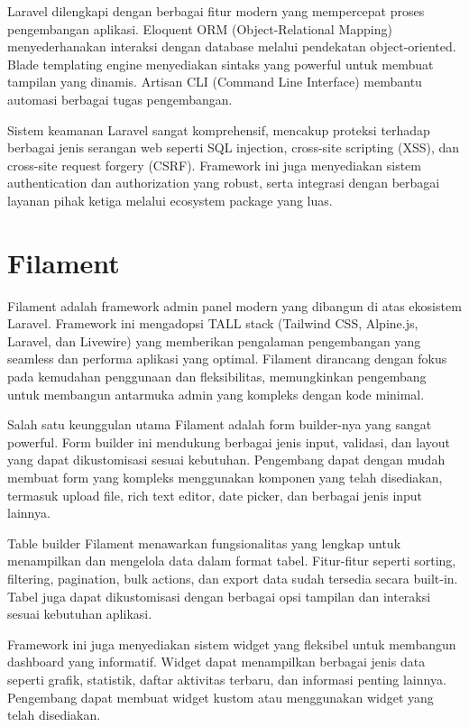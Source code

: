 \documentclass[a4paper,12pt]{report}
\begin{document}
Laravel dilengkapi dengan berbagai fitur modern yang mempercepat proses pengembangan aplikasi. Eloquent ORM (Object-Relational Mapping) menyederhanakan interaksi dengan database melalui pendekatan object-oriented. Blade templating engine menyediakan sintaks yang powerful untuk membuat tampilan yang dinamis. Artisan CLI (Command Line Interface) membantu automasi berbagai tugas pengembangan.

Sistem keamanan Laravel sangat komprehensif, mencakup proteksi terhadap berbagai jenis serangan web seperti SQL injection, cross-site scripting (XSS), dan cross-site request forgery (CSRF). Framework ini juga menyediakan sistem authentication dan authorization yang robust, serta integrasi dengan berbagai layanan pihak ketiga melalui ecosystem package yang luas.

\section{Filament}
Filament adalah framework admin panel modern yang dibangun di atas ekosistem Laravel. Framework ini mengadopsi TALL stack (Tailwind CSS, Alpine.js, Laravel, dan Livewire) yang memberikan pengalaman pengembangan yang seamless dan performa aplikasi yang optimal. Filament dirancang dengan fokus pada kemudahan penggunaan dan fleksibilitas, memungkinkan pengembang untuk membangun antarmuka admin yang kompleks dengan kode minimal.

Salah satu keunggulan utama Filament adalah form builder-nya yang sangat powerful. Form builder ini mendukung berbagai jenis input, validasi, dan layout yang dapat dikustomisasi sesuai kebutuhan. Pengembang dapat dengan mudah membuat form yang kompleks menggunakan komponen yang telah disediakan, termasuk upload file, rich text editor, date picker, dan berbagai jenis input lainnya.

Table builder Filament menawarkan fungsionalitas yang lengkap untuk menampilkan dan mengelola data dalam format tabel. Fitur-fitur seperti sorting, filtering, pagination, bulk actions, dan export data sudah tersedia secara built-in. Tabel juga dapat dikustomisasi dengan berbagai opsi tampilan dan interaksi sesuai kebutuhan aplikasi.

Framework ini juga menyediakan sistem widget yang fleksibel untuk membangun dashboard yang informatif. Widget dapat menampilkan berbagai jenis data seperti grafik, statistik, daftar aktivitas terbaru, dan informasi penting lainnya. Pengembang dapat membuat widget kustom atau menggunakan widget yang telah disediakan.
\end{document}
